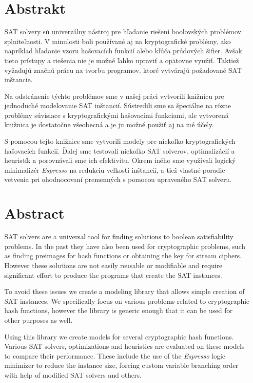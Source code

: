 \chapter*{Abstrakt}
SAT solvery sú univerzálny nástroj pre hľadanie riešení boolovských problémov spl\-ni\-teľ\-no\-sti.
V minulosti boli používané aj na kryptografické problémy, ako napríklad hľadanie vzoru hašovacích funkcií alebo kľúča prúdových šifier.
Avšak tieto prístupy a riešenia nie je možné ľahko upraviť a opätovne využiť.
Taktiež vyžadujú značnú prácu na tvorbu programov, ktoré vytvárajú požadované SAT inštancie.

Na odstránenie týchto problémov sme v našej práci vytvorili knižnicu pre jednoduché modelovanie SAT inštancií.
Sústredili sme sa špeciálne na rôzne problémy súvisiace s kryptografickými hašovacími funkciami, ale vytvorená knižnica je dostatočne všeobecná a je ju možné použiť aj na iné účely.

S pomocou tejto knižnice sme vytvorili modely pre niekoľko kryptografických hašovacích funkcií.
Ďalej sme testovali niekoľko SAT solverov, optimalizácií a heuristík a porovnávali sme ich efektivitu.
Okrem iného sme využívali logický minimalizér \emph{Espresso} na redukciu veľkosti inštancií, a tiež vlastné poradie vetvenia pri ohodnocovaní premenných s pomocou upraveného SAT solveru.

\chapter*{Abstract}
SAT solvers are a universal tool for finding solutions to boolean satisfiability problems.
In the past they have also been used for cryptographic problems, such as finding preimages for hash functions or obtaining the key for stream ciphers.
However these solutions are not easily reusable or modifiable and require significant effort to produce the programs that create the SAT instances.

To avoid these issues we create a modeling library that allows simple creation of SAT instances.
We specifically focus on various problems related to cryptographic hash functions, however the library is generic enough that it can be used for other purposes as well.

Using this library we create models for several cryptographic hash functions.
Various SAT solvers, optimizations and heuristics are evaluated on these models to compare their performance.
These include the use of the \emph{Espresso} logic minimizer to reduce the instance size, forcing custom variable branching order with help of modified SAT solvers and others.